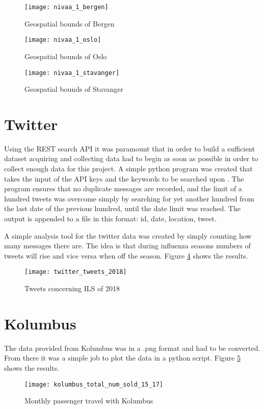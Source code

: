 \begin{figure}[ht]
\texttt{[image: nivaa\_1\_bergen]}
\centering
\caption{Geospatial bounds of Bergen}
\label{fig:boundsbergen}
\end{figure}

\begin{figure}[ht]
\texttt{[image: nivaa\_1\_oslo]}
\centering
\caption{Geospatial bounds of Oslo}
\label{fig:boundsoslo}
\end{figure}

\begin{figure}[ht]
\texttt{[image: nivaa\_1\_stavanger]}
\centering
\caption{Geospatial bounds of Stavanger}
\label{fig:boundsstavanger}
\end{figure}

\newpage\newpage

\section{Twitter}
Using the REST search API it was paramount that in order to build a sufficient dataset acquiring and collecting data had to begin as soon as possible in order to collect enough data for this project. A simple python program was created that takes the input of the API keys and the keywords to be searched upon . The program ensures that no duplicate messages are recorded, and the limit of a hundred tweets was overcome simply by searching for yet another hundred from the last date of the previous hundred, until the date limit was reached.
The output is appended to a file in this format: id, date, location, tweet.

A simple analysis tool for the twitter data was created by simply counting how many messages there are. The idea is that during influenza seasons numbers of tweets will rise and vice versa when off the season. Figure \ref{fig:twitterAnal} shows the results.

\begin{figure}[ht]
\texttt{[image: twitter\_tweets\_2018]}
\centering
\caption{Tweets concerning ILS of 2018}
\label{fig:twitterAnal}
\end{figure}

\section{Kolumbus}
The data provided from Kolumbus was in a .png format and had to be converted. From there it was a simple job to plot the data in a python script. Figure \ref{fig:kolumbus_15_17} shows the results.

\begin{figure}[ht]
\texttt{[image: kolumbus\_total\_num\_sold\_15\_17]}
\centering
\caption{Monthly passenger travel with Kolumbus}
\label{fig:kolumbus_15_17}
\end{figure}